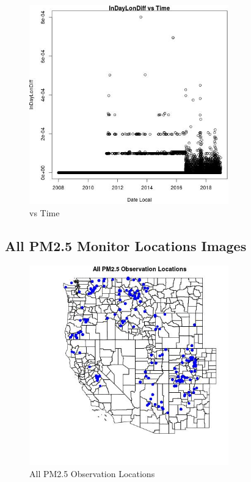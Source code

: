 \begin{figure} 
\centering  
\includegraphics[width=0.77\textwidth]{Code_Outputs/Report_PM25_Step4_part_e_de_duplicated_aves_ML_input_InDayLonDiffvDate_Local.jpg} 
\caption{\label{fig:Report_PM25_Step4_part_e_de_duplicated_aves_ML_inputInDayLonDiffvDate_Local}vs Time} 
\end{figure} 
 

\subsection{All PM2.5 Monitor Locations Images} 
 

\begin{figure} 
\centering  
\includegraphics[width=0.77\textwidth]{Code_Outputs/Report_PM25_Step4_part_e_de_duplicated_aves_ML_input_PlotLoc0.jpg} 
\caption{\label{fig:Report_PM25_Step4_part_e_de_duplicated_aves_ML_inputPlotLoc0}All PM2.5 Observation Locations} 
\end{figure} 
 

